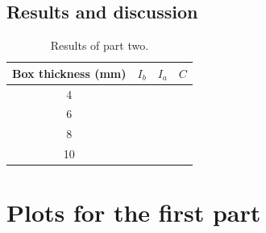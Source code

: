 \documentclass[a4paper]{article}
\begin{document}
\subsection{Results and discussion}
\begin{table}[H]
  \centering
  \begin{tabular}{|c|c|c|c|}
    \hline
    Box thickness (mm) & $I_{b}$ & $I_{a}$ & $C$ \\
    \hline
    4 & & & \\
    \hline
    6 & & & \\
    \hline
    8 & & & \\
    \hline
    10 & & & \\
    \hline
  \end{tabular}
  \caption{Results of part two.}
  \label{tab:part_two}
\end{table}

\clearpage


\appendix

\section{Plots for the first part}
\label{sec:appendix_1}
\end{document}
